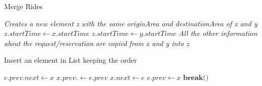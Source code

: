 \begin{algorithm}[H]
\caption{Merge Rides}
\begin{algorithmic}[1]
\State \textit{Creates a new element z with the same originArea and destinationArea of x and y}
	\State $z.startTime \gets x.startTime$
	\Else
	\State $z.startTime \gets y.startTime$
\EndIf
\State \textit{All the other information about the request/reservation are copied from x and y into z}
\EndProcedure
\end{algorithmic}
\end{algorithm}

\begin{algorithm}[H]
\caption{Insert an element in List keeping the order}
\begin{algorithmic}[1]
		\State $e.prev.next \gets x$
		\State $x.prev. \gets e.prev$
		\State $x.next \gets e$
		\State $e.prev \gets x$
		\State ${\textbf{break()}}$
	\EndIf
\EndFor
\EndProcedure
\end{algorithmic}
\end{algorithm}